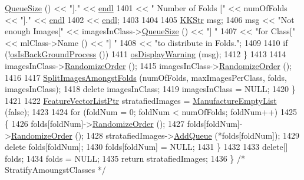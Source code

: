 \begin{DoxyCode}
      \hyperlink{class_k_k_b_1_1_k_k_queue_a1dab601f75ee6a65d97f02bddf71c40d}{QueueSize} () << \textcolor{stringliteral}{"]."}  << \hyperlink{namespace_k_k_b_ad1f50f65af6adc8fa9e6f62d007818a8}{endl}
1401                      << \textcolor{stringliteral}{"                Number of Folds ["} << numOfFolds                  << \textcolor{stringliteral}{"]."}  << 
      \hyperlink{namespace_k_k_b_ad1f50f65af6adc8fa9e6f62d007818a8}{endl}
1402                      << \hyperlink{namespace_k_k_b_ad1f50f65af6adc8fa9e6f62d007818a8}{endl};
1403 
1404     
1405       \hyperlink{class_k_k_b_1_1_k_k_str}{KKStr}  msg;
1406       msg << \textcolor{stringliteral}{"Not enough Images["} << imagesInClass->\hyperlink{class_k_k_b_1_1_k_k_queue_a1dab601f75ee6a65d97f02bddf71c40d}{QueueSize} ()  << \textcolor{stringliteral}{"] "}
1407           << \textcolor{stringliteral}{"for Class["}         << mlClass->Name ()          << \textcolor{stringliteral}{"] "}
1408           << \textcolor{stringliteral}{"to distribute in Folds."};
1409 
1410       \textcolor{keywordflow}{if}  (!\hyperlink{namespace_k_k_b_ad7a77701df638951d935a8a96998e910}{osIsBackGroundProcess} ())
1411       \hyperlink{namespace_k_k_b_acf68123327314e60e8213d162c80883f}{osDisplayWarning} (msg);
1412     \}
1413 
1414     imagesInClass->\hyperlink{class_k_k_b_1_1_k_k_queue_ab43920c3ec182b87d3affa1e1611e1b0}{RandomizeOrder} ();
1415     imagesInClass->\hyperlink{class_k_k_b_1_1_k_k_queue_ab43920c3ec182b87d3affa1e1611e1b0}{RandomizeOrder} ();
1416 
1417     \hyperlink{_feature_vector_8cpp_a01cd86018c094e325352a8604bf17c65}{SplitImagesAmongstFolds} (numOfFolds, maxImagesPerClass, folds, imagesInClass);
1418     \textcolor{keyword}{delete}  imagesInClass;
1419     imagesInClass = NULL;
1420   \}
1421 
1422   \hyperlink{class_k_k_m_l_l_1_1_feature_vector_list}{FeatureVectorListPtr} stratafiedImages = 
      \hyperlink{class_k_k_m_l_l_1_1_feature_vector_list_af533da1b34e4123f4fcb1343d5f48e37}{ManufactureEmptyList} (\textcolor{keyword}{false});
1423 
1424   \textcolor{keywordflow}{for}  (foldNum = 0; foldNum < numOfFolds; foldNum++)
1425   \{
1426     folds[foldNum]->\hyperlink{class_k_k_b_1_1_k_k_queue_ab43920c3ec182b87d3affa1e1611e1b0}{RandomizeOrder} ();
1427     folds[foldNum]->\hyperlink{class_k_k_b_1_1_k_k_queue_ab43920c3ec182b87d3affa1e1611e1b0}{RandomizeOrder} ();
1428     stratafiedImages->\hyperlink{class_k_k_m_l_l_1_1_feature_vector_list_a90809e07f7e33e591da0d266c1907ca9}{AddQueue} (*folds[foldNum]);
1429     \textcolor{keyword}{delete}  folds[foldNum];
1430     folds[foldNum] = NULL;
1431   \}
1432 
1433   \textcolor{keyword}{delete}[]  folds;
1434   folds = NULL;
1435   \textcolor{keywordflow}{return}  stratafiedImages;
1436 \}  \textcolor{comment}{/* StratifyAmoungstClasses */}
\end{DoxyCode}
